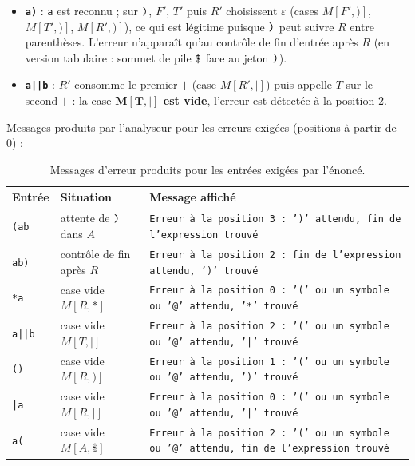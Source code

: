 \documentclass[12pt,a4paper]{article}
\newcommand{\code}[1]{{\fontsize{10}{12}\selectfont\texttt{#1}}}
\newcommand{\eps}{\ensuremath{\varepsilon}}
\newcommand{\tok}[1]{\ensuremath{\text{\fontsize{10}{12}\selectfont\ttfamily #1}}}
\begin{document}
\begin{itemize}
\item \textbf{\code{a)}} : \code{a} est reconnu ; sur \tok{)}, $F'$, $T'$ puis $R'$
  choisissent \eps{} (cases $M[F', \texttt{)}]$, $M[T', \texttt{)}]$, $M[R', \texttt{)}]$), ce
  qui est légitime puisque \tok{)} peut suivre $R$ entre parenthèses. L'erreur n'apparaît
  qu'au contrôle de fin d'entrée après $R$ (en version tabulaire : sommet de pile \tok{\$} face
  au jeton \tok{)}).
\item \textbf{\code{a||b}} : $R'$ consomme le premier \tok{|} (case $M[R', \texttt{|}]$) puis
  appelle $T$ sur le second \tok{|} : la case \textbf{$\boldsymbol{M[T, \texttt{|}]}$ est vide},
  l'erreur est détectée à la position 2.
\end{itemize}

\noindent Messages produits par l'analyseur pour les erreurs exigées (positions à partir de 0) :

\begin{table}[H]
\centering\small
\begin{tabularx}{\linewidth}{l l L}
\toprule
Entrée & Situation & Message affiché \\
\midrule
\code{(ab} & attente de \tok{)} dans $A$ & \code{Erreur à la position 3 : ')' attendu, fin de l'expression trouvé} \\
\code{ab)} & contrôle de fin après $R$ & \code{Erreur à la position 2 : fin de l'expression attendu, ')' trouvé} \\
\code{*a} & case vide $M[R, \texttt{*}]$ & \code{Erreur à la position 0 : '(' ou un symbole ou '@' attendu, '*' trouvé} \\
\code{a||b} & case vide $M[T, \texttt{|}]$ & \code{Erreur à la position 2 : '(' ou un symbole ou '@' attendu, '|' trouvé} \\
\code{()} & case vide $M[R, \texttt{)}]$ & \code{Erreur à la position 1 : '(' ou un symbole ou '@' attendu, ')' trouvé} \\
\code{|a} & case vide $M[R, \texttt{|}]$ & \code{Erreur à la position 0 : '(' ou un symbole ou '@' attendu, '|' trouvé} \\
\code{a(} & case vide $M[A, \texttt{\$}]$ & \code{Erreur à la position 2 : '(' ou un symbole ou '@' attendu, fin de l'expression trouvé} \\
\bottomrule
\end{tabularx}
\caption{Messages d'erreur produits pour les entrées exigées par l'énoncé.}
\end{table}
\end{document}

